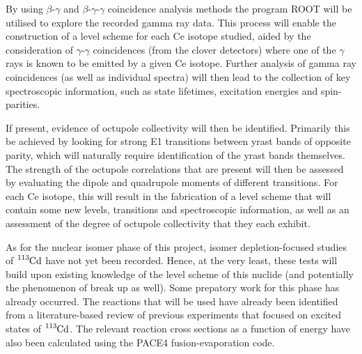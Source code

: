 \documentclass[12pt,a4paper]{article}
\begin{document}
\medskip
\noindent
By using $\beta$-$\gamma$ and $\beta$-$\gamma$-$\gamma$ coincidence analysis methods the program ROOT will be utilised to explore the recorded gamma ray data.
This process will enable the construction of a level scheme for each Ce isotope studied, aided by the consideration of $\gamma$-$\gamma$ coincidences (from the clover detectors) where one of the $\gamma$ rays is known to be emitted by a given Ce isotope.
Further analysis of gamma ray coincidences (as well as individual spectra) will then lead to the collection of key spectroscopic information, such as state lifetimes, excitation energies and spin-parities. %

\medskip
\noindent
If present, evidence of octupole collectivity will then be identified.
Primarily this be achieved by looking for strong E1 transitions between yrast bands of opposite parity, which will naturally require identification of the yrast bands themselves.
The strength of the octupole correlations that are present will then be assessed by evaluating the dipole and quadrupole moments of different transitions.
For each Ce isotope, this will result in the fabrication of a level scheme that will contain some new levels, transitions and spectroscopic information, as well as an assessment of the degree of octupole collectivity that they each exhibit.

\medskip
\noindent
As for the nuclear isomer phase of this project, isomer depletion-focused studies of $\ce{^{113}Cd}$ have not yet been recorded.
Hence, at the very least, these tests will build upon existing knowledge of the level scheme of this nuclide (and potentially the phenomenon of break up as well).
Some prepatory work for this phase has already occurred.
The reactions that will be used have already been identified from a literature-based review of previous experiments that focused on excited states of $\ce{^{113}Cd}$.
The relevant reaction cross sections as a function of energy have also been calculated using the PACE4 fusion-evaporation code.
\end{document}
